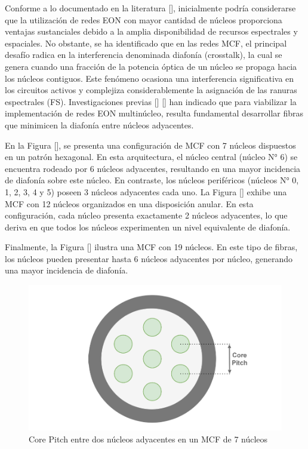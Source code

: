 Conforme a lo documentado en la literatura [], inicialmente podría considerarse que la utilización de redes EON con mayor cantidad de núcleos proporciona ventajas sustanciales debido a la amplia disponibilidad de recursos espectrales y espaciales. No obstante, se ha identificado que en las redes MCF, el principal desafío radica en la interferencia denominada diafonía (crosstalk), la cual se genera cuando una fracción de la potencia óptica de un núcleo se propaga hacia los núcleos contiguos.
 Este fenómeno ocasiona una interferencia significativa en los circuitos activos y complejiza considerablemente la asignación de las ranuras espectrales (FS). Investigaciones previas [] [] han indicado que para viabilizar la implementación de redes EON multinúcleo, resulta fundamental desarrollar fibras que minimicen la diafonía entre núcleos adyacentes.
%

 En la Figura [], se presenta una configuración de MCF con 7 núcleos dispuestos en un patrón hexagonal. En esta arquitectura, el núcleo central (núcleo N° 6) se encuentra rodeado por 6 núcleos adyacentes, resultando en una mayor incidencia de diafonía sobre este núcleo.
 En contraste, los núcleos periféricos (núcleos N° 0, 1, 2, 3, 4 y 5) poseen 3 núcleos adyacentes cada uno. La Figura [] exhibe una MCF con 12 núcleos organizados en una disposición anular. En esta configuración, cada núcleo presenta exactamente 2 núcleos adyacentes, lo que deriva en que todos los núcleos experimenten un nivel equivalente de diafonía.

 Finalmente, la Figura [] ilustra una MCF con 19 núcleos. En este tipo de fibras, los núcleos pueden presentar hasta 6 núcleos adyacentes por núcleo, generando una mayor incidencia de diafonía.
%

\begin{figure}[H]
    \centering
    \includegraphics[width=1\textwidth]{capitulos/img/CORE_PITCH.png}
    \caption{Core Pitch entre dos núcleos adyacentes en un MCF de 7 núcleos}
    \label{fig:CORE_PITCH}
\end{figure}

